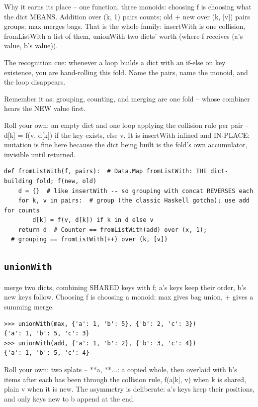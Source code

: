 \documentclass[10pt,letterpaper]{book}
\begin{document}
Why it earns its place -- one function, three monoids: choosing f is choosing what the dict MEANS. Addition over (k, 1) pairs counts; old + new over (k, [v]) pairs groups; max merges bags. That is the whole family: insertWith is one collision, fromListWith a list of them, unionWith two dicts' worth (where f receives (a's value, b's value)).


The recognition cue: whenever a loop builds a dict with an if-else on key existence, you are hand-rolling this fold. Name the pairs, name the monoid, and the loop disappears.


Remember it as: grouping, counting, and merging are one fold -- whose combiner hears the NEW value first.


Roll your own: an empty dict and one loop applying the collision rule per pair -- d[k] = f(v, d[k]) if the key exists, else v. It is insertWith inlined and IN-PLACE: mutation is fine here because the dict being built is the fold's own accumulator, invisible until returned.

\begin{lstlisting}[style=ex]
def fromListWith(f, pairs):  # Data.Map fromListWith: THE dict-building fold; f(new, old)
    d = {}  # like insertWith -- so grouping with concat REVERSES each
    for k, v in pairs:  # group (the classic Haskell gotcha); use add for counts
        d[k] = f(v, d[k]) if k in d else v
    return d  # Counter == fromListWith(add) over (x, 1);
  # grouping == fromListWith(++) over (k, [v])
\end{lstlisting}

\subsection{\texttt{unionWith}}\label{def:unionWith}
merge two dicts, combining SHARED keys with f; a's keys keep their order, b's new keys follow. Choosing f is choosing a monoid: max gives bag union, + gives a summing merge.
\begin{lstlisting}[style=ex]
>>> unionWith(max, {'a': 1, 'b': 5}, {'b': 2, 'c': 3})
{'a': 1, 'b': 5, 'c': 3}
>>> unionWith(add, {'a': 1, 'b': 2}, {'b': 3, 'c': 4})
{'a': 1, 'b': 5, 'c': 4}
\end{lstlisting}

Roll your own: two splats -- {**a, **{...}}: a copied whole, then overlaid with b's items after each has been through the collision rule, f(a[k], v) when k is shared, plain v when it is new. The asymmetry is deliberate: a's keys keep their positions, and only keys new to b append at the end.
\end{document}
